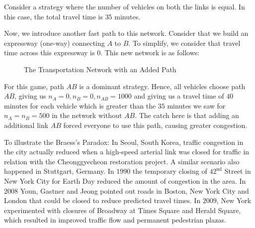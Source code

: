 \documentclass{article}
\theoremstyle{definition}
\begin{document}
Consider a strategy where the number of vehicles on both the links is equal. In this case, the total travel time is $35$ minutes.

\bigskip

Now, we introduce another fast path to this network. Consider that we build an expressway (one-way) connecting $A$ to $B$. To simplify, we consider that travel time across this expressway is $0$. This new network is as follows:

\begin{figure}[!h]
  \centering
{}  \caption{The Transportation Network with an Added Path}
  \label{fig:braess2}
\end{figure}

For this game, path $AB$ is a dominant strategy. Hence, all vehicles choose path $AB$, giving us $n_A = 0, n_B=0, n_{AB} = 1000$ and giving us a travel time of $40$ minutes for each vehicle which is greater than the $35$ minutes we saw for $n_A = n_B = 500$ in the network without $AB$. The catch here is that adding an additional link $AB$ forced everyone to use this path, causing greater congestion. \medskip

To illustrate the Braess's Paradox: In Seoul, South Korea, traffic congestion in the city actually reduced when a high-speed arterial link was closed for traffic in relation with the Cheonggyecheon restoration project. A similar scenario also happened in Stuttgart, Germany. In $1990$ the temporary closing of $42^{\text{nd}}$ Street in New York City for Earth Day reduced the amount of congestion in the area. In $2008$ Youn, Gastner and Jeong pointed out roads in Boston, New York City and London that could be closed to reduce predicted travel times. In $2009$, New York experimented with closures of Broadway at Times Square and Herald Square, which resulted in improved traffic flow and permanent pedestrian plazas.
\end{document}
